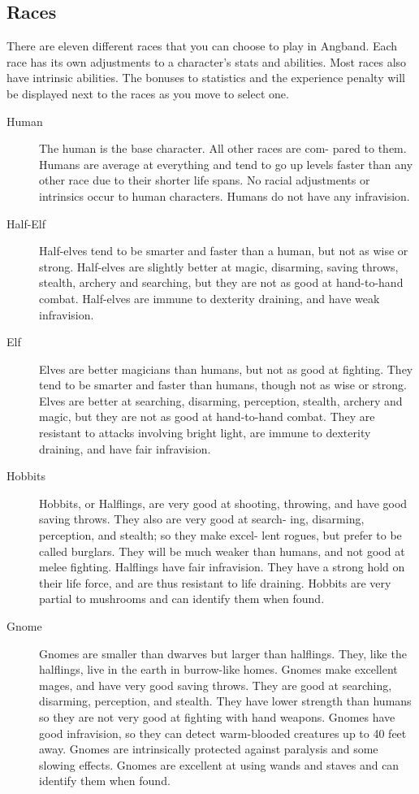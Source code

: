 \subsection{Races}
There are eleven different races that you can choose to play in Angband.
Each race has its own adjustments to a character's stats and abilities.
Most races also have intrinsic abilities. The bonuses to statistics and
the experience penalty will be displayed next to the races as you move
to select one.
\begin{description}
\item[Human] The human is the base character. All other races are com-
     pared to them. Humans are average at everything and tend to go
     up levels faster than any other race due to their shorter life
     spans. No racial adjustments or intrinsics occur to human
     characters. Humans do not have any infravision.

\item[Half-Elf] Half-elves tend to be smarter and faster than a human, but
     not as wise or strong. Half-elves are slightly better at magic,
     disarming, saving throws, stealth, archery and searching, but
     they are not as good at hand-to-hand combat. Half-elves are
     immune to dexterity draining, and have weak infravision.

\item[Elf] Elves are better magicians than humans, but not as good at
     fighting. They tend to be smarter and faster than humans,
     though not as wise or strong. Elves are better at searching,
     disarming, perception, stealth, archery and magic, but they are
     not as good at hand-to-hand combat. They are resistant to
     attacks involving bright light, are immune to dexterity
     draining, and have fair infravision.

\item[Hobbits] Hobbits, or Halflings, are very good at shooting, throwing, and
     have good saving throws. They also are very good at search-
     ing, disarming, perception, and stealth; so they make excel-
     lent rogues, but prefer to be called burglars. They will be
     much weaker than humans, and not good at melee fighting.
     Halflings have fair infravision. They have a strong hold
     on their life force, and are thus resistant to life
     draining. Hobbits are very partial to mushrooms and can
     identify them when found.

\item[Gnome] Gnomes are smaller than dwarves but larger than halflings.
     They, like the halflings, live in the earth in burrow-like
     homes. Gnomes make excellent mages, and have very good saving
     throws. They are good at searching, disarming, perception,
     and stealth. They have lower strength than humans so they
     are not very good at fighting with hand weapons. Gnomes have
     good infravision, so they can detect warm-blooded creatures
     up to 40 feet away. Gnomes are intrinsically protected against
     paralysis and some slowing effects. Gnomes are excellent at
     using wands and staves and can identify them when found.


\end{description}
